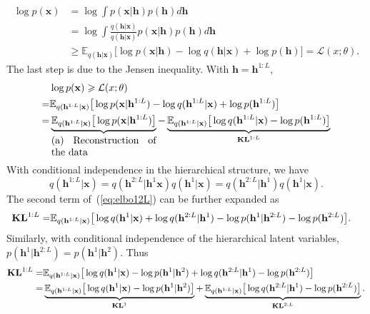 \documentclass{article}
\begin{document}
\begin{align*}
\log p(\mathbf{x}) &= \log \int p(\mathbf{x}|\mathbf{h})p(\mathbf{h}) d \mathbf{h} \\
&= \log \int \frac{q(\mathbf{h}|\mathbf{x})}{q(\mathbf{h}|\mathbf{x})} p(\mathbf{x}|\mathbf{h})p(\mathbf{h}) d \mathbf{h} \\
& \geqslant \mathbb{E}_{q(\mathbf{h}|\mathbf{x})}\big[ \log p(\mathbf{x}|\mathbf{h}) -  \log q(\mathbf{h}|\mathbf{x}) +  \log p(\mathbf{h}) \big] = \mathcal{L}(x; \theta).
\end{align*}
The last step is due to the Jensen inequality. With $\mathbf{h} =\mathbf{h}^{1:L} $, 
\begin{align} \notag  %
&\log p(\mathbf{x})  \geqslant  \mathcal{L}(x; \theta) \\ \notag
=& \mathbb{E}_{q(\mathbf{h}^{1:L}|\mathbf{x})}\big[ \log p(\mathbf{x}|\mathbf{h}^{1:L}) -  \log q(\mathbf{h}^{1:L}|\mathbf{x}) +  \log p(\mathbf{h}^{1:L}) \big] \\ \label{eq:elbo12L}
=&  \underbrace{\mathbb{E}_{q(\mathbf{h}^{1:L}|\mathbf{x})}\big[ \log p(\mathbf{x}|\mathbf{h}^{1:L})\big]}_{\parbox{10.5em}{(a) Reconstruction of the data}}  -  \underbrace{\mathbb{E}_{q(\mathbf{h}^{1:L}|\mathbf{x})}\big[ \log q(\mathbf{h}^{1:L}|\mathbf{x}) - \log p(\mathbf{h}^{1:L}) \big] }_{\textbf{\text{KL}}^{1:L}}
\end{align}
With conditional independence in   the hierarchical structure, we have 
$$q(\mathbf{h}^{1:L}|\mathbf{x})=q(\mathbf{h}^{2:L}|\mathbf{h}^1\mathbf{x})q(\mathbf{h}^{1}|\mathbf{x})=q(\mathbf{h}^{2:L}|\mathbf{h}^1)q(\mathbf{h}^{1}|\mathbf{x}).$$
The second term of~(\ref{eq:elbo12L}) can be further expanded as 
 \begin{align} \notag 
\textbf{\text{KL}}^{1:L} =&  \mathbb{E}_{q(\mathbf{h}^{1:L}|\mathbf{x})}\big[  \log q(\mathbf{h}^{1}|\mathbf{x})  +  \log q(\mathbf{h}^{2:L}|\mathbf{h}^{1})  - \log p(\mathbf{h}^{1}|\mathbf{h}^{2:L}) - \log p(\mathbf{h}^{2:L})  \big].
\end{align}
Similarly, with conditional independence of the hierarchical latent variables, $ p(\mathbf{h}^{1}|\mathbf{h}^{2:L})= p(\mathbf{h}^{1}|\mathbf{h}^{2})$. Thus
 \begin{align} \notag 
\textbf{\text{KL}}^{1:L} =&  \mathbb{E}_{q(\mathbf{h}^{1:L}|\mathbf{x})}\big[  \log q(\mathbf{h}^{1}|\mathbf{x})   - \log p(\mathbf{h}^{1}|\mathbf{h}^{2})  +  \log q(\mathbf{h}^{2:L}|\mathbf{h}^{1})- \log p(\mathbf{h}^{2:L})  \big]\\ \notag
=&  \underbrace{\mathbb{E}_{q(\mathbf{h}^{1:L}|\mathbf{x})}\big[  \log q(\mathbf{h}^{1}|\mathbf{x})   - \log p(\mathbf{h}^{1}|\mathbf{h}^{2}) \big]}_{\mathbf{KL}^1} + \underbrace{\mathbb{E}_{q(\mathbf{h}^{1:L}|\mathbf{x})}\big[  \log q(\mathbf{h}^{2:L}|\mathbf{h}^{1})- \log p(\mathbf{h}^{2:L})  \big]}_{\mathbf{KL}^{2:L}}.
\end{align}
\end{document}
